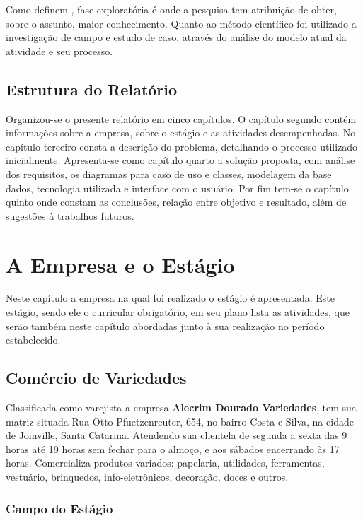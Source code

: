 \documentclass[
	12pt,
	openright,
	oneside, %
	a4paper,
	chapter=TITLE,
	section=TITLE,
	english,
	brazil %
	]{abntex2-udesc}
\begin{document}
Como definem , fase exploratória é onde a pesquisa tem atribuição de obter, sobre o assunto, maior conhecimento. Quanto ao método científico foi utilizado a investigação de campo e estudo de caso, através do análise do modelo atual da atividade e seu processo.

\section{Estrutura do Relatório}

Organizou-se o presente relatório em cinco capítulos. O capítulo segundo contém informações sobre a empresa, sobre o estágio e as atividades desempenhadas. No capítulo terceiro consta a descrição do problema, detalhando o processo utilizado inicialmente. Apresenta-se como capítulo quarto a solução proposta, com análise dos requisitos, os diagramas para caso de uso e classes, modelagem da base dados, tecnologia utilizada e interface com o usuário. Por fim tem-se o capítulo quinto onde constam as conclusões, relação entre objetivo e resultado, além de sugestões à trabalhos futuros.

\chapter{A Empresa e o Estágio}

Neste capítulo a empresa na qual foi realizado o estágio é apresentada. Este estágio, sendo ele o curricular obrigatório, em seu plano lista as atividades, que serão também neste capítulo abordadas junto à sua realização no período estabelecido.

\section{Comércio de Variedades}

Classificada como varejista a empresa \textbf{Alecrim Dourado Variedades}, tem sua matriz situada Rua Otto Pfuetzenreuter, 654, no bairro Costa e Silva, na cidade de Joinville, Santa Catarina. Atendendo sua clientela de segunda a sexta das 9 horas até 19 horas sem fechar para o almoço, e aos sábados encerrando às 17 horas. Comercializa produtos variados: papelaria, utilidades, ferramentas, vestuário, brinquedos, info-eletrônicos, decoração, doces e outros.

\subsection{Campo do Estágio}
\end{document}
